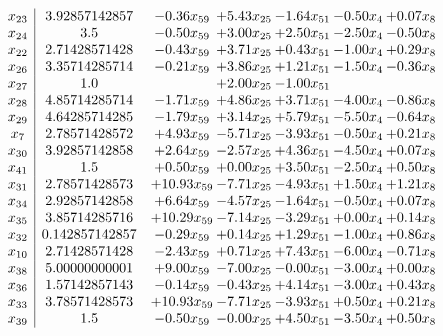 \documentclass[8pt]{article}
\begin{document}
\[\begin{array}{c| c c@{\hskip 2pt} c@{\hskip 2pt} c@{\hskip 2pt} c@{\hskip 2pt} c@{\hskip 2pt} }
 x_{23}   &  3.92857142857 & -0.36 x_{59} & +  5.43 x_{25} & -1.64 x_{51} & -0.50 x_{4} & +  0.07 x_{8}\\
 x_{24}   &  3.5 & -0.50 x_{59} & +  3.00 x_{25} & +  2.50 x_{51} & -2.50 x_{4} & -0.50 x_{8}\\
 x_{22}   &  2.71428571428 & -0.43 x_{59} & +  3.71 x_{25} & +  0.43 x_{51} & -1.00 x_{4} & +  0.29 x_{8}\\
 x_{26}   &  3.35714285714 & -0.21 x_{59} & +  3.86 x_{25} & +  1.21 x_{51} & -1.50 x_{4} & -0.36 x_{8}\\
 x_{27}   &  1.0  &   & +  2.00 x_{25} & -1.00 x_{51} &    &   \\
 x_{28}   &  4.85714285714 & -1.71 x_{59} & +  4.86 x_{25} & +  3.71 x_{51} & -4.00 x_{4} & -0.86 x_{8}\\
 x_{29}   &  4.64285714285 & -1.79 x_{59} & +  3.14 x_{25} & +  5.79 x_{51} & -5.50 x_{4} & -0.64 x_{8}\\
 x_{7}   &  2.78571428572 & +  4.93 x_{59} & -5.71 x_{25} & -3.93 x_{51} & -0.50 x_{4} & +  0.21 x_{8}\\
 x_{30}   &  3.92857142858 & +  2.64 x_{59} & -2.57 x_{25} & +  4.36 x_{51} & -4.50 x_{4} & +  0.07 x_{8}\\
 x_{41}   &  1.5 & +  0.50 x_{59} & +  0.00 x_{25} & +  3.50 x_{51} & -2.50 x_{4} & +  0.50 x_{8}\\
 x_{31}   &  2.78571428573 & + 10.93 x_{59} & -7.71 x_{25} & -4.93 x_{51} & +  1.50 x_{4} & +  1.21 x_{8}\\
 x_{34}   &  2.92857142858 & +  6.64 x_{59} & -4.57 x_{25} & -1.64 x_{51} & -0.50 x_{4} & +  0.07 x_{8}\\
 x_{35}   &  3.85714285716 & + 10.29 x_{59} & -7.14 x_{25} & -3.29 x_{51} & +  0.00 x_{4} & +  0.14 x_{8}\\
 x_{32}   &  0.142857142857 & -0.29 x_{59} & +  0.14 x_{25} & +  1.29 x_{51} & -1.00 x_{4} & +  0.86 x_{8}\\
 x_{10}   &  2.71428571428 & -2.43 x_{59} & +  0.71 x_{25} & +  7.43 x_{51} & -6.00 x_{4} & -0.71 x_{8}\\
 x_{38}   &  5.00000000001 & +  9.00 x_{59} & -7.00 x_{25} & -0.00 x_{51} & -3.00 x_{4} & +  0.00 x_{8}\\
 x_{36}   &  1.57142857143 & -0.14 x_{59} & -0.43 x_{25} & +  4.14 x_{51} & -3.00 x_{4} & +  0.43 x_{8}\\
 x_{33}   &  3.78571428573 & + 10.93 x_{59} & -7.71 x_{25} & -3.93 x_{51} & +  0.50 x_{4} & +  0.21 x_{8}\\
 x_{39}   &  1.5 & -0.50 x_{59} & -0.00 x_{25} & +  4.50 x_{51} & -3.50 x_{4} & +  0.50 x_{8}\\

\end{array}\]
\end{document}
